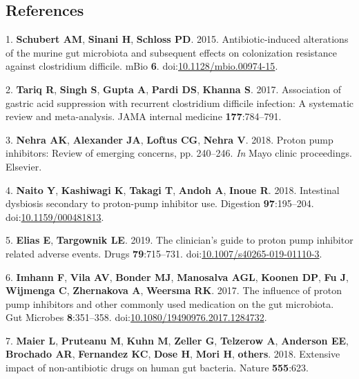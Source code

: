 \documentclass[11pt,]{article}
\begin{document}
\subsection{References}\label{references}

\hypertarget{refs}{}
\hypertarget{ref-Schubert2015}{}
1. \textbf{Schubert AM}, \textbf{Sinani H}, \textbf{Schloss PD}. 2015.
Antibiotic-induced alterations of the murine gut microbiota and
subsequent effects on colonization resistance against clostridium
difficile. mBio \textbf{6}.
doi:\href{https://doi.org/10.1128/mbio.00974-15}{10.1128/mbio.00974-15}.

\hypertarget{ref-tariq2017association}{}
2. \textbf{Tariq R}, \textbf{Singh S}, \textbf{Gupta A}, \textbf{Pardi
DS}, \textbf{Khanna S}. 2017. Association of gastric acid suppression
with recurrent clostridium difficile infection: A systematic review and
meta-analysis. JAMA internal medicine \textbf{177}:784--791.

\hypertarget{ref-nehra2018proton}{}
3. \textbf{Nehra AK}, \textbf{Alexander JA}, \textbf{Loftus CG},
\textbf{Nehra V}. 2018. Proton pump inhibitors: Review of emerging
concerns, pp. 240--246. \emph{In} Mayo clinic proceedings. Elsevier.

\hypertarget{ref-Naito2018}{}
4. \textbf{Naito Y}, \textbf{Kashiwagi K}, \textbf{Takagi T},
\textbf{Andoh A}, \textbf{Inoue R}. 2018. Intestinal dysbiosis secondary
to proton-pump inhibitor use. Digestion \textbf{97}:195--204.
doi:\href{https://doi.org/10.1159/000481813}{10.1159/000481813}.

\hypertarget{ref-Elias2019}{}
5. \textbf{Elias E}, \textbf{Targownik LE}. 2019. The clinician's guide
to proton pump inhibitor related adverse events. Drugs
\textbf{79}:715--731.
doi:\href{https://doi.org/10.1007/s40265-019-01110-3}{10.1007/s40265-019-01110-3}.

\hypertarget{ref-Imhann2017}{}
6. \textbf{Imhann F}, \textbf{Vila AV}, \textbf{Bonder MJ},
\textbf{Manosalva AGL}, \textbf{Koonen DP}, \textbf{Fu J},
\textbf{Wijmenga C}, \textbf{Zhernakova A}, \textbf{Weersma RK}. 2017.
The influence of proton pump inhibitors and other commonly used
medication on the gut microbiota. Gut Microbes \textbf{8}:351--358.
doi:\href{https://doi.org/10.1080/19490976.2017.1284732}{10.1080/19490976.2017.1284732}.

\hypertarget{ref-maier2018extensive}{}
7. \textbf{Maier L}, \textbf{Pruteanu M}, \textbf{Kuhn M},
\textbf{Zeller G}, \textbf{Telzerow A}, \textbf{Anderson EE},
\textbf{Brochado AR}, \textbf{Fernandez KC}, \textbf{Dose H},
\textbf{Mori H}, \textbf{others}. 2018. Extensive impact of
non-antibiotic drugs on human gut bacteria. Nature \textbf{555}:623.
\end{document}
